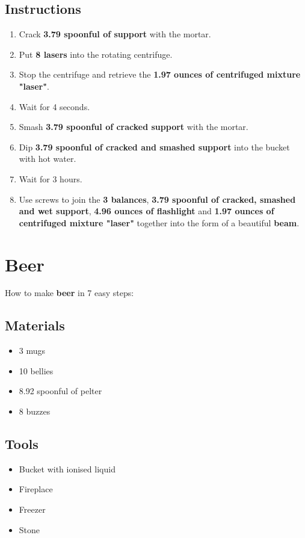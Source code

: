 \documentclass{article}
\begin{document}
\subsection{Instructions}\begin{enumerate}
\item 
Crack \textbf{3.79 spoonful of support} with the mortar.
\item 
Put \textbf{8 lasers} into the rotating centrifuge.
\item 
Stop the centrifuge and retrieve the \textbf{1.97 ounces of centrifuged mixture "laser"}.
\item 
Wait for 4 seconds.
\item 
Smash \textbf{3.79 spoonful of cracked support} with the mortar.
\item 
Dip \textbf{3.79 spoonful of cracked and smashed support} into the bucket with hot water.
\item 
Wait for 3 hours.
\item 
Use screws to join the \textbf{3 balances}, \textbf{3.79 spoonful of cracked, smashed and wet support}, \textbf{4.96 ounces of flashlight} and \textbf{1.97 ounces of centrifuged mixture "laser"} together into the form of a beautiful \textbf{beam}.
\end{enumerate}
\newpage
\section{Beer}How to make \textbf{beer} in 7 easy steps:

\subsection{Materials}\begin{itemize}
\item 
3 mugs
\item 
10 bellies
\item 
8.92 spoonful of pelter
\item 
8 buzzes
\end{itemize}
\subsection{Tools}\begin{itemize}
\item 
Bucket with ionised liquid
\item 
Fireplace
\item 
Freezer
\item 
Stone
\end{itemize}
\end{document}
